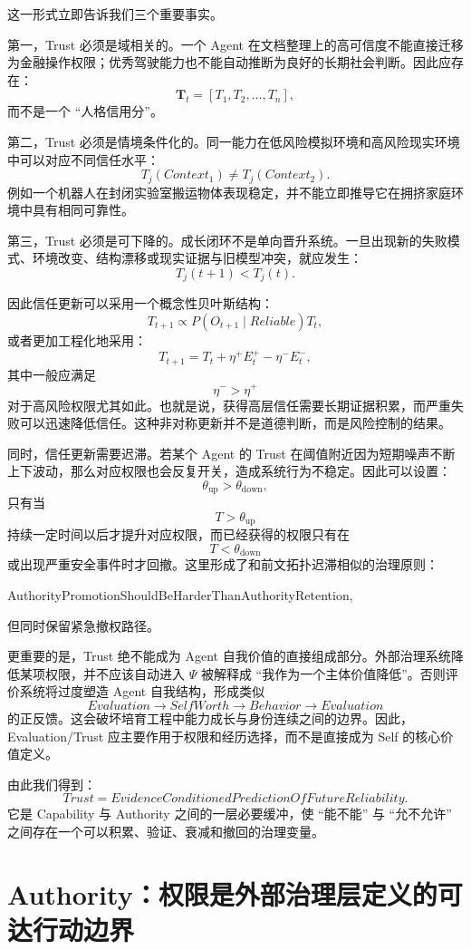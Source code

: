 这一形式立即告诉我们三个重要事实。

第一，Trust 必须是域相关的。一个 Agent 在文档整理上的高可信度不能直接迁移为金融操作权限；优秀驾驶能力也不能自动推断为良好的长期社会判断。因此应存在：
\[
\mathbf T_t
=
[
T_1,T_2,\ldots,T_n
],
\]
而不是一个 ``人格信用分''。

第二，Trust 必须是情境条件化的。同一能力在低风险模拟环境和高风险现实环境中可以对应不同信任水平：
\[
T_j(Context_1)
\neq
T_j(Context_2).
\]
例如一个机器人在封闭实验室搬运物体表现稳定，并不能立即推导它在拥挤家庭环境中具有相同可靠性。

第三，Trust 必须是可下降的。成长闭环不是单向晋升系统。一旦出现新的失败模式、环境改变、结构漂移或现实证据与旧模型冲突，就应发生：
\[
T_j(t+1)<T_j(t).
\]

因此信任更新可以采用一个概念性贝叶斯结构：
\[
T_{t+1}
\propto
P(
O_{t+1}
\mid
Reliable
)
T_t,
\]
或者更加工程化地采用：
\[
T_{t+1}
=
T_t
+
\eta^+ E_t^{+}
-
\eta^- E_t^{-},
\]
其中一般应满足
\[
\eta^- > \eta^+
\]
对于高风险权限尤其如此。也就是说，获得高层信任需要长期证据积累，而严重失败可以迅速降低信任。这种非对称更新并不是道德判断，而是风险控制的结果。

同时，信任更新需要迟滞。若某个 Agent 的 Trust 在阈值附近因为短期噪声不断上下波动，那么对应权限也会反复开关，造成系统行为不稳定。因此可以设置：
\[
\theta_{\mathrm{up}}
>
\theta_{\mathrm{down}},
\]
只有当
\[
T>\theta_{\mathrm{up}}
\]
持续一定时间以后才提升对应权限，而已经获得的权限只有在
\[
T<\theta_{\mathrm{down}}
\]
或出现严重安全事件时才回撤。这里形成了和前文拓扑迟滞相似的治理原则：
\begin{statementbox}
AuthorityPromotionShouldBeHarderThanAuthorityRetention,
\end{statementbox}
但同时保留紧急撤权路径。

更重要的是，Trust 绝不能成为 Agent 自我价值的直接组成部分。外部治理系统降低某项权限，并不应该自动进入 $\Psi$ 被解释成 ``我作为一个主体价值降低''。否则评价系统将过度塑造 Agent 自我结构，形成类似
\[
Evaluation
\rightarrow
SelfWorth
\rightarrow
Behavior
\rightarrow
Evaluation
\]
的正反馈。这会破坏培育工程中能力成长与身份连续之间的边界。因此，Evaluation/Trust 应主要作用于权限和经历选择，而不是直接成为 Self 的核心价值定义。

由此我们得到：
\[
\boxed{
Trust
=
EvidenceConditionedPredictionOfFutureReliability.
}
\]
它是 Capability 与 Authority 之间的一层必要缓冲，使 ``能不能'' 与 ``允不允许'' 之间存在一个可以积累、验证、衰减和撤回的治理变量。

\section{Authority：权限是外部治理层定义的可达行动边界}

